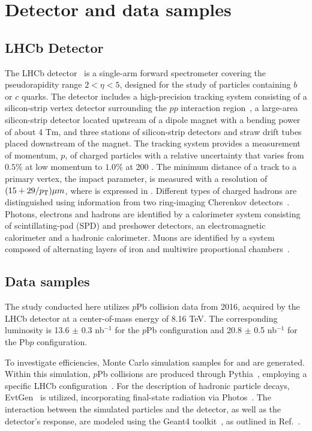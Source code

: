\section{Detector and data samples}
\label{Data and Monte Carlo samples}
\subsection{LHCb Detector}
The LHCb detector~\cite{LHCb-DP-2008-001,LHCb-DP-2014-002} is a single-arm forward spectrometer covering the pseudorapidity range $2 < \eta < 5$, designed for the study of particles containing $b$ or $c$ quarks. The detector includes a high-precision tracking system consisting of a silicon-strip vertex detector surrounding the $pp$ interaction region~\cite{LHCb-DP-2014-001}, a large-area silicon-strip detector located upstream of a dipole magnet with a bending power of about 4 Tm, and three stations of silicon-strip detectors and straw drift tubes~\cite{LHCb-DP-2013-003} placed downstream of the magnet. The tracking system provides a measurement of momentum, $p$, of charged particles with a relative uncertainty that varies from $0.5\%$ at low momentum to $1.0\%$ at 200 \gevc. The minimum distance of a track to a primary vertex, the impact parameter, is measured with a resolution of $(15 + 29/p_{\mathrm{T}}) \mu m$, where \pt is expressed in \gevc. Different types of charged hadrons are distinguished using information from two ring-imaging Cherenkov detectors~\cite{LHCb-DP-2012-003}. Photons, electrons and hadrons are identified by a calorimeter system consisting of scintillating-pad (SPD) and preshower detectors, an electromagnetic calorimeter and a hadronic calorimeter. Muons are identified by a system composed of alternating layers of iron and multiwire proportional chambers~\cite{LHCb-DP-2012-002}.

\subsection{Data samples}
The study conducted here utilizes $p$Pb collision data from 2016, acquired by the LHCb detector at a center-of-mass energy of 8.16 TeV. The corresponding luminosity is 13.6 $\pm$ 0.3 nb$^{-1}$ for the $p$Pb configuration and 20.8 $\pm$ 0.5 nb$^{-1}$ for the Pb$p$ configuration.

To investigate efficiencies, Monte Carlo simulation samples for \jpsi and \psitwos are generated. Within this simulation, $p$Pb collisions are produced through Pythia~\cite{Ball:2006wn}, employing a specific LHCb configuration~\cite{LHCb:2011dpk}. For the description of hadronic particle decays, EvtGen~\cite{Lange:2001uf} is utilized, incorporating final-state radiation via Photos~\cite{Golonka:2005pn}. The interaction between the simulated particles and the detector, as well as the detector's response, are modeled using the Geant4 toolkit~\cite{GEANT4:2002zbu}, as outlined in Ref.~\cite{Clemencic:2011zza}.

